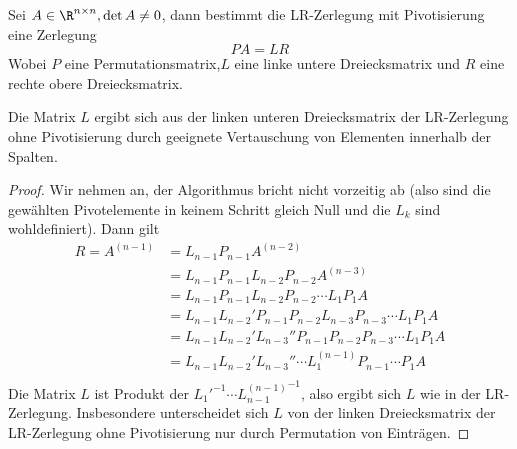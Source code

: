 \documentclass[a4paper]{scrartcl}
\numberwithin{equation}{section}
\begin{document}
\begin{st}
	\label{st:3.8}
	Sei $A\in \R^{n\times n}, \det A\neq 0$, dann bestimmt die LR-Zerlegung mit Pivotisierung eine Zerlegung 
	\[
		PA=LR
	\]
	Wobei $P$ eine Permutationsmatrix,$L$ eine linke untere Dreiecksmatrix und $R$ eine rechte obere Dreiecksmatrix.

	Die Matrix $L$ ergibt sich aus der linken unteren Dreiecksmatrix der LR-Zerlegung ohne Pivotisierung durch geeignete Vertauschung von Elementen innerhalb der Spalten.
	\begin{proof}
		Wir nehmen an, der Algorithmus bricht nicht vorzeitig ab (also sind die gewählten Pivotelemente in keinem Schritt gleich Null und die $L_k$ sind wohldefiniert).
		Dann gilt
		\begin{align*}
			R = A^{(n-1)} &= L_{n-1} P_{n-1}A^{(n-2)} \\
					   &= L_{n-1}P_{n-1}L_{n-2}P_{n-2}A^{(n-3)} \\
					   &= L_{n-1}P_{n-1}L_{n-2}P_{n-2}\dotsb L_1P_1A \\
					   &= L_{n-1}L_{n-2}'P_{n-1}P_{n-2}L_{n-3}P_{n-3} \dotsb L_1P_1A \\
					   &= L_{n-1}L_{n-2}' L_{n-3}'' P_{n-1}P_{n-2}P_{n-3} \dotsb L_1P_1A\\
					   &= L_{n-1}L_{n-2}'L_{n-3}''\dotsb  L_1^{(n-1)} P_{n-1}\dotsb P_1 A\\
		\end{align*}
		Die Matrix $L$ ist Produkt der ${L_1'}^{-1} \dotsb {L_{n-1}^{(n-1)}}^{-1}$,
		also ergibt sich $L$ wie in der LR-Zerlegung.
		Insbesondere unterscheidet sich $L$ von der linken Dreiecksmatrix der LR-Zerlegung ohne Pivotisierung nur durch Permutation von Einträgen.


\end{proof}
\end{st}
\end{document}
